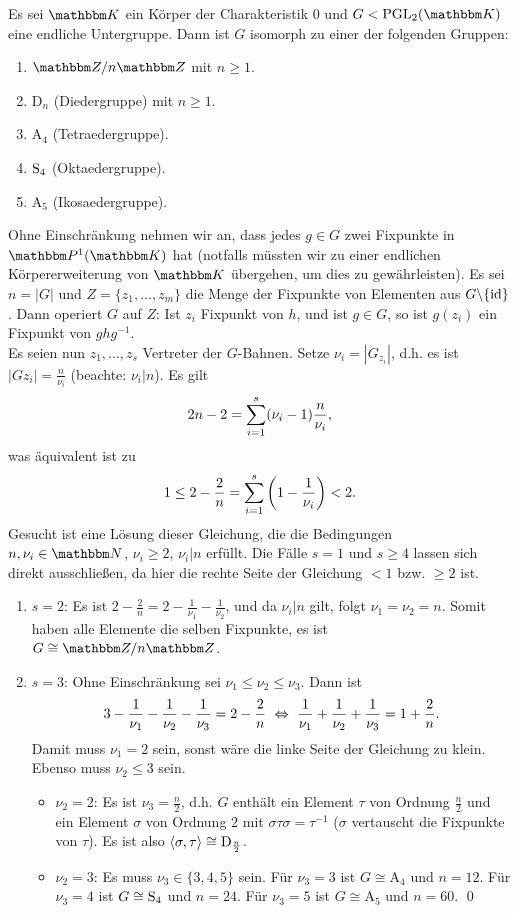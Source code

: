 \documentclass[a4paper, 12pt, twoside]{article}
\begin{document}
\SATZ Es sei $\KK$ ein Körper der Charakteristik $0$ und
$G<\PGL_2(\KK)$ eine endliche Untergruppe.
Dann ist $G$ isomorph zu einer der folgenden Gruppen:
\begin{enumerate}
\item $\ZZ/n\ZZ$ mit $n\geq 1$.
\item $\mathrm{D}_n$ (Diedergruppe) mit $n\geq 1$.
\item $\mathrm{A}_4$ (Tetraedergruppe).
\item $\mathrm{S}_4$ (Oktaedergruppe).
\item $\mathrm{A}_5$ (Ikosaedergruppe).
\end{enumerate}
\bew Ohne Einschränkung nehmen wir an, dass jedes $g\in G$ zwei
Fixpunkte in $\PP^1(\KK)$ hat (notfalls müssten wir zu einer
endlichen Körpererweiterung von $\KK$ übergehen, um dies zu
gewährleisten). Es sei $n=|G|$ und $Z=\{z_1,\ldots,z_m\}$
die Menge der Fixpunkte von Elementen aus $G\backslash\{\mathrm{id}\}$.
Dann operiert $G$ auf $Z$: Ist $z_i$ Fixpunkt von $h$, und ist
$g\in G$, so ist $g(z_i)$ ein Fixpunkt von $ghg^{-1}$.\\
Es seien nun $z_1,\ldots,z_s$ Vertreter der $G$-Bahnen.
Setze $\nu_i=|G_{z_i}|$, d.h. es ist $|G z_i|=\frac{n}{\nu_i}$
(beachte: $\nu_i|n$). Es gilt
\[
2n-2 = \overset{s}{\underset{i=1}{\mathop{\sum}}}(\nu_i-1)\frac{n}{\nu_i},
\]
was äquivalent ist zu
\[
1\leq 2-\frac{2}{n} = \overset{s}{\underset{i=1}{\mathop{\sum}}}\left(1-\frac{1}{\nu_i}\right)
< 2.
\]
Gesucht ist eine Lösung dieser Gleichung, die die Bedingungen
$n,\nu_i\in\NN$, $\nu_i\geq 2$, $\nu_i|n$ erfüllt.
Die Fälle $s=1$ und $s\geq 4$ lassen sich direkt ausschließen,
da hier die rechte Seite der Gleichung $<1$ bzw. $\geq 2$ ist.
\begin{enumerate}
\item[]$s=2$: Es ist
$2-\frac{2}{n}=2-\frac{1}{\nu_1}-\frac{1}{\nu_2}$, und da $\nu_i|n$
gilt, folgt $\nu_1=\nu_2=n$. Somit haben alle Elemente die selben
Fixpunkte, es ist $G\cong\ZZ/n\ZZ$.
\item[]$s=3$: Ohne Einschränkung sei $\nu_1\leq\nu_2\leq\nu_3$.
Dann ist
\[
3-\frac{1}{\nu_1}-\frac{1}{\nu_2}-\frac{1}{\nu_3}=2-\frac{2}{n}
\ \lra\ 
\frac{1}{\nu_1}+\frac{1}{\nu_2}+\frac{1}{\nu_3}=1+\frac{2}{n}.
\]
Damit muss $\nu_1=2$ sein, sonst wäre die linke Seite der Gleichung
zu klein. Ebenso muss $\nu_2\leq 3$ sein.
\begin{itemize}
\item[]$\nu_2=2$: Es ist $\nu_3=\frac{n}{2}$, d.h. $G$ enthält
ein Element $\tau$ von Ordnung $\frac{n}{2}$ und ein Element
$\sigma$ von Ordnung $2$ mit $\sigma\tau\sigma=\tau^{-1}$
($\sigma$ vertauscht die Fixpunkte von $\tau$).
Es ist also $\langle\sigma,\tau\rangle\cong\mathrm{D}_{\frac{n}{2}}$.
\item[] $\nu_2=3$: Es muss $\nu_3\in\{3,4,5\}$ sein.
Für $\nu_3=3$ ist $G\cong\mathrm{A}_4$ und $n=12$.
Für $\nu_3=4$ ist $G\cong\mathrm{S}_4$ und $n=24$.
Für $\nu_3=5$ ist $G\cong\mathrm{A}_5$ und $n=60$.
\qed
\end{itemize}
\end{enumerate}
\end{document}
